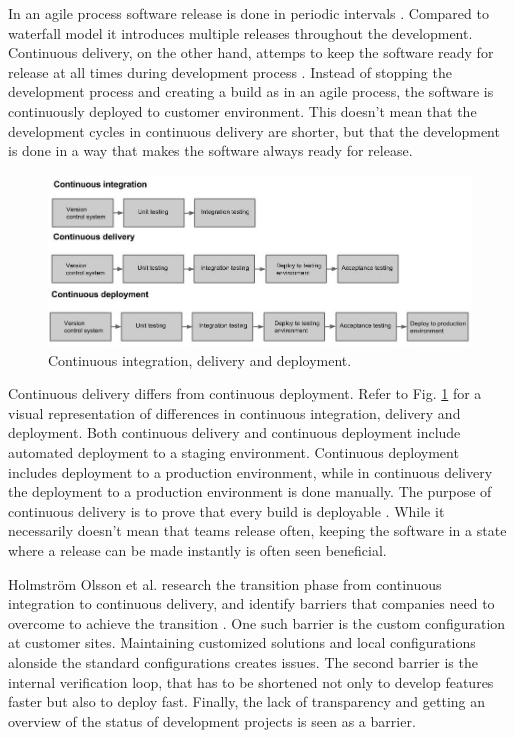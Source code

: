 \documentclass[english]{tktltiki2}
\theoremstyle{definition}
\theoremstyle{remark}
\begin{document}
In an agile process software release is done in periodic intervals \cite{cockburn2002agile}. Compared to waterfall model it introduces multiple releases throughout the development. Continuous delivery, on the other hand, attemps to keep the software ready for release at all times during development process \cite{cdbook}. Instead of stopping the development process and creating a build as in an agile process, the software is continuously deployed to customer environment. This doesn't mean that the development cycles in continuous delivery are shorter, but that the development is done in a way that makes the software always ready for release.
\begin{figure}[h]
	\centering
	\includegraphics[width=5.0in]{rtvd.jpg}
	\caption{Continuous integration, delivery and deployment.}
	\label{fig2}
\end{figure}
Continuous delivery differs from continuous deployment. Refer to Fig. \ref{fig2} for a visual representation of differences in continuous integration, delivery and deployment. Both continuous delivery and continuous deployment include automated deployment to a staging environment. Continuous deployment includes deployment to a production environment, while in continuous delivery the deployment to a production environment is done manually. The purpose of continuous delivery is to prove that every build is deployable \cite{cdbook}. While it necessarily doesn't mean that teams release often, keeping the software in a state where a release can be made instantly is often seen beneficial.

Holmström Olsson et al. research the transition phase from continuous integration to continuous delivery, and identify barriers that companies need to overcome to achieve the transition \cite{olsson2012climbing}. One such barrier is the custom configuration at customer sites. Maintaining customized solutions and local configurations alonside the standard configurations creates issues. The second barrier is the internal verification loop, that has to be shortened not only to develop features faster but also to deploy fast. Finally, the lack of transparency and getting an overview of the status of development projects is seen as a barrier.
\end{document}
